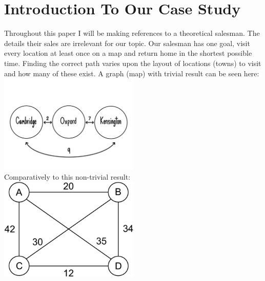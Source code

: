 \documentclass[12pt]{report}
\begin{document}
\section{Introduction To Our Case Study}
Throughout this paper I will be making references to a theoretical salesman.
The details their sales are irrelevant for our topic.
Our salesman has one goal, visit every location at least once on a map and return home in the shortest possible time.
Finding the correct path varies upon the layout of locations (towns) to visit and how many of these exist.
A graph (map) with trivial result can be seen here:\\
\includegraphics[width=0.5\textwidth]{trivialTSP.png}\\
\vspace{0.5cm}
Comparatively to this non-trivial result:\\
\includegraphics[width=0.5\textwidth]{HarderTSP.png}
\end{document}
